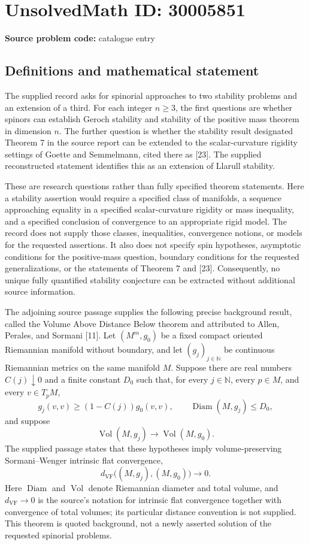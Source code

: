 \documentclass[11pt]{article}
\newcommand{\N}{\mathbb{N}}
\begin{document}
\section*{UnsolvedMath ID: 30005851}
\textbf{Source problem code:} catalogue entry
\subsection{Definitions and mathematical statement}
The supplied record asks for spinorial approaches to two stability problems and an extension of a third. For each integer \(n\geq 3\), the first questions are whether spinors can establish Geroch stability and stability of the positive mass theorem in dimension \(n\). The further question is whether the stability result designated Theorem 7 in the source report can be extended to the scalar-curvature rigidity settings of Goette and Semmelmann, cited there as [23]. The supplied reconstructed statement identifies this as an extension of Llarull stability.

These are research questions rather than fully specified theorem statements. Here a stability assertion would require a specified class of manifolds, a sequence approaching equality in a specified scalar-curvature rigidity or mass inequality, and a specified conclusion of convergence to an appropriate rigid model. The record does not supply those classes, inequalities, convergence notions, or models for the requested assertions. It also does not specify spin hypotheses, asymptotic conditions for the positive-mass question, boundary conditions for the requested generalizations, or the statements of Theorem 7 and [23]. Consequently, no unique fully quantified stability conjecture can be extracted without additional source information.

The adjoining source passage supplies the following precise background result, called the Volume Above Distance Below theorem and attributed to Allen, Perales, and Sormani [11]. Let \((M^m,g_0)\) be a fixed compact oriented Riemannian manifold without boundary, and let \((g_j)_{j\in\N}\) be continuous Riemannian metrics on the same manifold \(M\). Suppose there are real numbers \(C(j)\downarrow0\) and a finite constant \(D_0\) such that, for every \(j\in\N\), every \(p\in M\), and every \(v\in T_pM\),
\[
 g_j(v,v)\geq (1-C(j))g_0(v,v),
 \qquad \operatorname{Diam}(M,g_j)\leq D_0,
\]
and suppose
\[
 \operatorname{Vol}(M,g_j)\longrightarrow\operatorname{Vol}(M,g_0).
\]
The supplied passage states that these hypotheses imply volume-preserving Sormani--Wenger intrinsic flat convergence,
\[
 d_{\mathrm{VF}}\bigl((M,g_j),(M,g_0)\bigr)\longrightarrow0.
\]
Here \(\operatorname{Diam}\) and \(\operatorname{Vol}\) denote Riemannian diameter and total volume, and \(d_{\mathrm{VF}}\to0\) is the source's notation for intrinsic flat convergence together with convergence of total volumes; its particular distance convention is not supplied. This theorem is quoted background, not a newly asserted solution of the requested spinorial problems.
\end{document}
